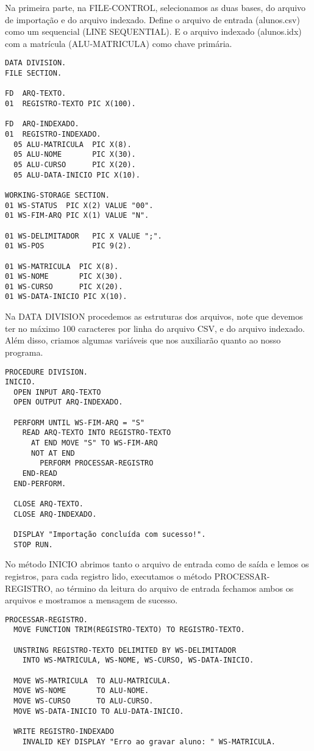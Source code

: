Na primeira parte, na FILE-CONTROL, selecionamos as duas bases, do arquivo de importação e do arquivo indexado. Define o arquivo de entrada (alunos.csv) como um sequencial (LINE SEQUENTIAL). E o arquivo indexado (alunos.idx) com a matrícula (ALU-MATRICULA) como chave primária.
\begin{lstlisting}[]
DATA DIVISION.
FILE SECTION.

FD  ARQ-TEXTO.
01  REGISTRO-TEXTO PIC X(100).

FD  ARQ-INDEXADO.
01  REGISTRO-INDEXADO.
  05 ALU-MATRICULA  PIC X(8).
  05 ALU-NOME       PIC X(30).
  05 ALU-CURSO      PIC X(20).
  05 ALU-DATA-INICIO PIC X(10).

WORKING-STORAGE SECTION.
01 WS-STATUS  PIC X(2) VALUE "00".
01 WS-FIM-ARQ PIC X(1) VALUE "N".

01 WS-DELIMITADOR   PIC X VALUE ";".
01 WS-POS           PIC 9(2).

01 WS-MATRICULA  PIC X(8).
01 WS-NOME       PIC X(30).
01 WS-CURSO      PIC X(20).
01 WS-DATA-INICIO PIC X(10).	
\end{lstlisting}

Na DATA DIVISION procedemos as estruturas dos arquivos, note que devemos ter no máximo 100 caracteres por linha do arquivo CSV, e do arquivo indexado. Além disso, criamos algumas variáveis que nos auxiliarão quanto ao nosso programa.
\begin{lstlisting}[]
PROCEDURE DIVISION.
INICIO.
  OPEN INPUT ARQ-TEXTO
  OPEN OUTPUT ARQ-INDEXADO.

  PERFORM UNTIL WS-FIM-ARQ = "S"
    READ ARQ-TEXTO INTO REGISTRO-TEXTO
      AT END MOVE "S" TO WS-FIM-ARQ
      NOT AT END
        PERFORM PROCESSAR-REGISTRO
    END-READ
  END-PERFORM.

  CLOSE ARQ-TEXTO.
  CLOSE ARQ-INDEXADO.

  DISPLAY "Importação concluída com sucesso!".
  STOP RUN.	
\end{lstlisting}

No método INICIO abrimos tanto o arquivo de entrada como de saída e lemos os registros, para cada registro lido, executamos o método PROCESSAR-REGISTRO, ao término da leitura do arquivo de entrada fechamos ambos os arquivos e mostramos a mensagem de sucesso.
\begin{lstlisting}[]
PROCESSAR-REGISTRO.
  MOVE FUNCTION TRIM(REGISTRO-TEXTO) TO REGISTRO-TEXTO.

  UNSTRING REGISTRO-TEXTO DELIMITED BY WS-DELIMITADOR
    INTO WS-MATRICULA, WS-NOME, WS-CURSO, WS-DATA-INICIO.

  MOVE WS-MATRICULA  TO ALU-MATRICULA.
  MOVE WS-NOME       TO ALU-NOME.
  MOVE WS-CURSO      TO ALU-CURSO.
  MOVE WS-DATA-INICIO TO ALU-DATA-INICIO.

  WRITE REGISTRO-INDEXADO
    INVALID KEY DISPLAY "Erro ao gravar aluno: " WS-MATRICULA.	
\end{lstlisting}

